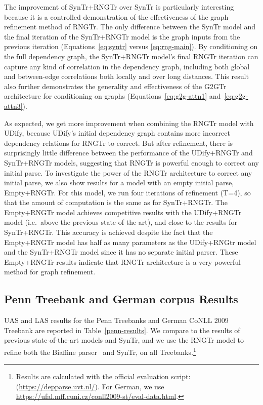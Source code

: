 The improvement of SynTr+RNGTr over SynTr is particularly interesting because it is a controlled demonstration of the effectiveness of the graph refinement method of RNGTr.  The only difference between the SynTr model and the final iteration of the SynTr+RNGTr model is the graph inputs from the previous iteration (Equations~\eqref{eq:syntr} versus \eqref{eq:rng-main}).
By conditioning on the full dependency graph, the SynTr+RNGTr model's final RNGTr iteration can capture any kind of correlation in the dependency graph, including both global and between-edge correlations both locally and over long distances.
This result also further demonstrates the generality and effectiveness of the G2GTr architecture for conditioning on graphs (Equations~\eqref{eq:g2g-attn1} and~\eqref{eq:g2g-attn3}).

As expected, we get more improvement when combining the RNGTr model with UDify, because UDify's initial dependency graph contains more incorrect dependency relations for RNGTr to correct.
But after refinement, there is surprisingly little difference between the performance of the UDify+RNGTr and SynTr+RNGTr models, suggesting that RNGTr is powerful enough to correct any initial parse.  
To investigate the power of the RNGTr architecture to correct any initial parse, we also show results for a model with an empty initial parse, Empty+RNGTr.  For this model, we run four iterations of refinement (T=4), so that the amount of computation is the same as for SynTr+RNGTr.
The Empty+RNGTr model achieves competitive results with the UDify+RNGTr model (i.e.\ above the previous state-of-the-art), and close to the results for SynTr+RNGTr.  This accuracy is achieved despite the fact that the Empty+RNGTr model has half as many parameters as the UDify+RNGtr model and the SynTr+RNGTr model since it has no separate initial parser.
These Empty+RNGTr results indicate that RNGTr architecture is a very powerful method for graph refinement.

\subsection{Penn Treebank and German corpus Results}

UAS and LAS results for the Penn Treebanks and German CoNLL 2009 Treebank are reported in Table~\ref{penn-results}.
We compare to the results of previous state-of-the-art models and SynTr, and we use the RNGTr model to refine both the Biaffine parser~\cite{dozat2016deep} and SynTr, on all Treebanks.\footnote{Results are calculated with the official evaluation script: (\url{https://depparse.uvt.nl/}). For German, we use \url{https://ufal.mff.cuni.cz/conll2009-st/eval-data.html}.}

